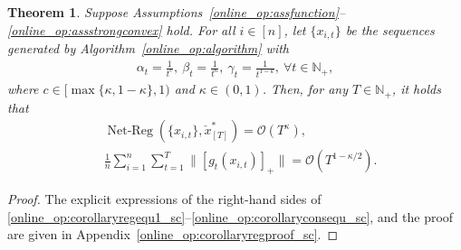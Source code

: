 \documentclass[12pt,draftcls,onecolumn]{IEEEtran}%
\newtheorem{theorem}{Theorem}
\DeclareMathOperator{\NetReg}{Net-Reg}
\begin{document}
\begin{theorem}\label{online_op:corollaryreg_sc}
	Suppose Assumptions~\ref{online_op:assfunction}--\ref{online_op:assstrongconvex} hold. For all $i\in[n]$, let $\{x_{i,t}\}$ be the sequences generated by Algorithm~\ref{online_op:algorithm} with
	\begin{align}\label{online_op:stepsize1_sc}
		\alpha_t=\frac{1}{t^{c}},~\beta_t=\frac{1}{t^\kappa},
		~\gamma_t=\frac{1}{t^{1-k}},~\forall t\in\mathbb{N}_+,
	\end{align} where $c\in[\max\{\kappa,1-\kappa\},1)$ and $\kappa\in(0,1)$. Then, for any $T\in\mathbb{N}_+$, it holds that
	\begin{align}
		&\NetReg(\{x_{i,t}\},\check{x}^*_{[T]})
		=\mathcal{O}(T^{\kappa}),\label{online_op:corollaryregequ1_sc}\\
		&\frac{1}{n}\sum_{i=1}^n\sum_{t=1}^T\|[g_{t}(x_{i,t})]_+\|=
		\mathcal{O}(T^{1-\kappa/2}).
		\label{online_op:corollaryconsequ_sc}
	\end{align}
\end{theorem}
\begin{proof}
	The explicit expressions of the right-hand sides of \eqref{online_op:corollaryregequ1_sc}--\eqref{online_op:corollaryconsequ_sc}, and the proof are given in  Appendix~\ref{online_op:corollaryregproof_sc}.
\end{proof}
\end{document}
